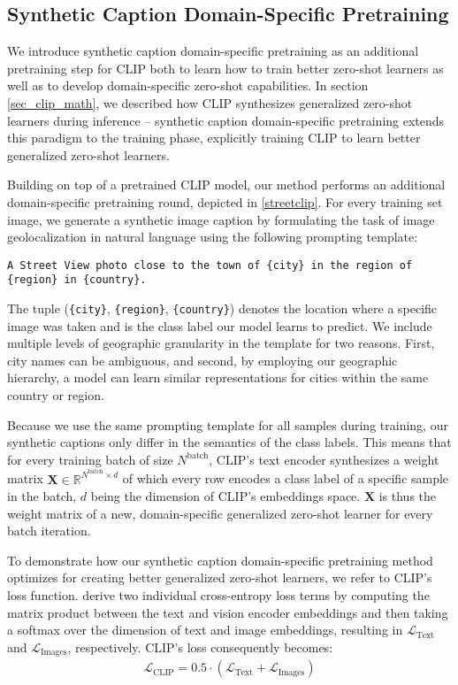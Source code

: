\documentclass{article}
\begin{document}
\subsection{Synthetic Caption Domain-Specific Pretraining}
\label{sec:scdp}

We introduce synthetic caption domain-specific pretraining as an additional pretraining step for CLIP both to learn how to train better zero-shot learners as well as to develop domain-specific zero-shot capabilities. In section \ref{sec_clip_math}, we described how CLIP synthesizes generalized zero-shot learners during inference – synthetic caption domain-specific pretraining extends this paradigm to the training phase, explicitly training CLIP to learn better generalized zero-shot learners.

Building on top of a pretrained CLIP model, our method performs an additional domain-specific pretraining round, depicted in \cref{streetclip}. For every training set image, we generate a synthetic image caption by formulating the task of image geolocalization in natural language using the following prompting template: 

\begin{verbatim}
A Street View photo close to the town of {city} in the region of {region} in {country}.
\end{verbatim}
\label{tmp:training}

The tuple (\texttt{\{city\}}, \texttt{\{region\}}, \texttt{\{country\}}) denotes the location where a specific image was taken and is the class label our model learns to predict. We include multiple levels of geographic granularity in the template for two reasons. First, city names can be ambiguous, and second, by employing our geographic hierarchy, a model can learn similar representations for cities within the same country or region.

Because we use the same prompting template for all samples during training, our synthetic captions only differ in the semantics of the class labels. This means that for every training batch of size $N^{\text{batch}}$, CLIP's text encoder synthesizes a weight matrix $\textbf{X} \in \mathbb{R}^{N^{\text{batch}} \times d}$ of which every row encodes a class label of a specific sample in the batch, $d$ being the dimension of CLIP's embeddings space. $\textbf{X}$ is thus the weight matrix of a new, domain-specific generalized zero-shot learner for every batch iteration.

To demonstrate how our synthetic caption domain-specific pretraining method optimizes for creating better generalized zero-shot learners, we refer to CLIP's loss function. \citet{radford21a} derive two individual cross-entropy loss terms by computing the matrix product between the text and vision encoder embeddings and then taking a softmax over the dimension of text and image embeddings, resulting in $\mathcal{L}_{\text{Text}}$ and $\mathcal{L}_{\text{Images}}$, respectively. CLIP's loss consequently becomes:
\begin{align}
    \mathcal{L}_{\text{CLIP}} = 0.5 \cdot (\mathcal{L}_{\text{Text}} + \mathcal{L}_{\text{Images}})
\end{align}
\end{document}
